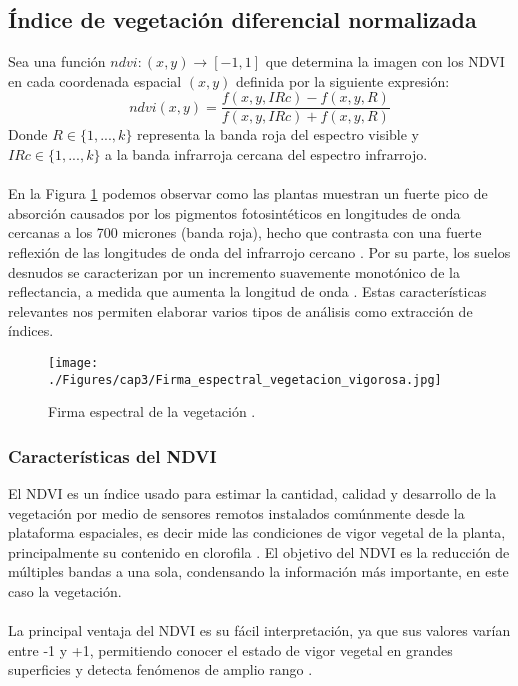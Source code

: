 \subsection{\'Indice de vegetaci\'on diferencial normalizada}\label{subsec:ndvi}
Sea una funci\'on $ ndvi:(x,y) \longrightarrow [-1,1] $ que determina la imagen con los NDVI en cada coordenada espacial $ (x,y) $ definida por la siguiente expresi\'on:
\begin{equation}
\label{e:ndvi}
ndvi(x,y)=\dfrac{f(x,y,IRc)-f(x,y,R)}{f(x,y,IRc)+f(x,y,R)}
\end{equation}
Donde $ R \in \{1,...,k\}$ representa la banda roja del espectro visible y  $ IRc \in \{1,...,k\}$ a la banda infrarroja cercana del espectro infrarrojo.\\~\\
En la Figura \ref{fig:firmaVegetacion} podemos observar como las plantas muestran un fuerte pico de absorci\'on causados por los pigmentos fotosint\'eticos en longitudes de onda cercanas a los 700 micrones (banda roja), hecho que contrasta con una fuerte reflexi\'on de las longitudes de onda del infrarrojo cercano \cite{salinero2002teledeteccion}. Por su parte, los suelos desnudos se caracterizan por un incremento suavemente monot\'onico de la reflectancia, a medida que aumenta la longitud de onda \cite{salinero2002teledeteccion}. Estas caracter\'isticas relevantes nos permiten elaborar varios tipos de an\'alisis como extracci\'on de \'indices.
\begin{figure}[H]
	\centering
	\texttt{[image: ./Figures/cap3/Firma\_espectral\_vegetacion\_vigorosa.jpg]}
	\caption{Firma espectral de la vegetaci\'on \cite{ndvi2015com}.}
	\label{fig:firmaVegetacion}
\end{figure}

\subsubsection{Caracter\'isticas del NDVI}\label{subsec:subndvi}
El NDVI es un \'indice usado para estimar la cantidad, calidad y desarrollo de la vegetaci\'on por medio de sensores remotos instalados com\'unmente desde la plataforma espaciales, es decir mide las condiciones de vigor vegetal de la planta, principalmente su contenido en clorofila \cite{salinero2002teledeteccion}. El objetivo del NDVI es la reducci\'on de m\'ultiples bandas a una sola, condensando la informaci\'on m\'as importante, en este caso la vegetaci\'on.\\~\\
La principal ventaja del NDVI es su f\'acil interpretaci\'on, ya que sus valores var\'ian entre -1 y +1, permitiendo conocer el estado de vigor vegetal en grandes superficies y detecta fen\'omenos de amplio rango \cite{salinero2002teledeteccion}.\\~\\


